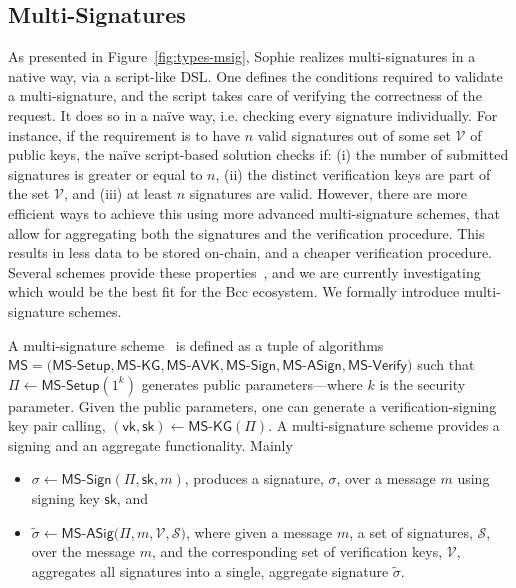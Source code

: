 \subsection{Multi-Signatures}
As presented in Figure~\ref{fig:types-msig}, Sophie realizes multi-signatures 
in a native way, via a script-like DSL. One defines the conditions required to 
validate a multi-signature, and the script takes care of verifying the 
correctness of the request. It does so in a na\"ive way, i.e. checking every 
signature individually. For instance, if the requirement is to have $n$ valid 
signatures out of some set $\mathcal{V}$ of public keys, the na\"ive 
script-based solution checks if: (i) the number of submitted signatures is 
greater or equal to $n$, (ii) the distinct verification keys are part of the set 
$\mathcal{V}$, and (iii) at least $n$ signatures are valid. However, there are 
more efficient ways to achieve this using more advanced multi-signature schemes, 
that allow for aggregating both the signatures and the verification procedure. 
This results in less data to be stored on-chain, and a cheaper verification 
procedure. Several schemes provide these properties~\cite{musigBoneh, musig, 
musig2, pixel}, and we are currently investigating which would be the best fit 
for the Bcc ecosystem. We formally introduce multi-signature schemes.

\sloppy
A multi-signature scheme~\cite{musigs} is defined as a tuple of algorithms 
$\textsf{MS} = (\textsf{MS-Setup}, \textsf{MS-KG}, \textsf{MS-AVK}, 
\allowbreak\textsf{MS-Sign}, \textsf{MS-ASign}, \textsf{MS-Verify)}$ such that 
$\Pi\leftarrow\textsf{MS-Setup}(1^k)$ generates public parameters---where $k$ is 
the security parameter. Given the public parameters, one can generate a 
verification-signing key pair calling, 
$(\mathsf{vk,sk})\leftarrow\textsf{MS-KG}(\Pi)$. A multi-signature scheme 
provides a signing and an aggregate functionality. Mainly
\begin{itemize}
\item $\sigma\leftarrow\textsf{MS-Sign}(\Pi, \mathsf{sk}, m)$, produces a 
signature, $\sigma$, over a message $m$ using signing key $\mathsf{sk}$, and
\item $\tilde{\sigma}\leftarrow\textsf{MS-ASig}(\Pi, m, \mathcal{V, S)}$, where 
given a message $m$, a set of signatures, $\mathcal{S}$, over the message $m$, 
and the corresponding set of verification keys, $\mathcal{V}$, aggregates all 
signatures into a single, aggregate signature $\tilde{\sigma}$. 
\end{itemize}

